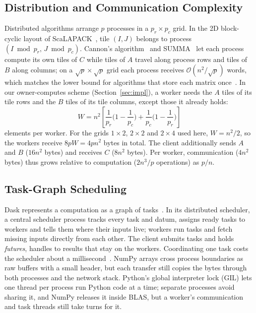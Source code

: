 \documentclass[conference,a4paper]{IEEEtran}
\newcommand{\bigO}[1]{\mathcal{O}\!\left(#1\right)}
\begin{document}
\subsection{Distribution and Communication Complexity}
\label{sec:bg-comm}
Distributed algorithms arrange $p$ processes in a $p_r \times p_c$ grid. In the
2D block-cyclic layout of ScaLAPACK~\cite{blackford1997}, tile $(I, J)$ belongs
to process $(I \bmod p_r,\, J \bmod p_c)$. Cannon's algorithm~\cite{cannon1969}
and SUMMA~\cite{vandegeijn1997} let each process compute its own tiles of $C$
while tiles of $A$ travel along process rows and tiles of $B$ along columns; on a
$\sqrt{p} \times \sqrt{p}$ grid each process receives $\bigO{n^2/\sqrt{p}}$
words, which matches the lower bound for algorithms that store each matrix
once~\cite{irony2004}. In our owner-computes scheme
(Section~\ref{sec:impl}), a worker needs the $A$ tiles of its tile rows and the
$B$ tiles of its tile columns, except those it already holds:
\begin{equation}
  W = n^2 \left[\frac{1}{p_r}\Big(1 - \frac{1}{p_c}\Big)
             + \frac{1}{p_c}\Big(1 - \frac{1}{p_r}\Big)\right]
  \label{eq:comm}
\end{equation}
elements per worker. For the grids $1 \times 2$, $2 \times 2$ and $2 \times 4$
used here, $W = n^2/2$, so the workers receive $8pW = 4pn^2$ bytes in total.
The client additionally sends $A$ and $B$ ($16n^2$ bytes) and receives $C$
($8n^2$ bytes). Per worker, communication ($4n^2$ bytes) thus grows relative to
computation ($2n^3/p$ operations) as $p/n$.

\subsection{Task-Graph Scheduling}
Dask represents a computation as a graph of tasks~\cite{rocklin2015,dask2016}.
In its distributed scheduler, a central scheduler process tracks every task and
datum, assigns ready tasks to workers and tells them where their inputs live;
workers run tasks and fetch missing inputs directly from each other. The client
submits tasks and holds \emph{futures}, handles to results that stay on the
workers. Coordinating one task costs the scheduler about a
millisecond~\cite{daskeff}. NumPy arrays cross process boundaries as raw buffers
with a small header, but each transfer still copies the bytes through both
processes and the network stack. Python's global interpreter lock (GIL) lets
one thread per process run Python code at a time; separate processes avoid
sharing it, and NumPy releases it inside BLAS, but a worker's communication and
task threads still take turns for it.
\end{document}

